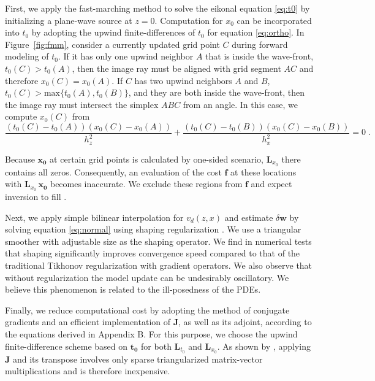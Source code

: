 First, we apply the fast-marching method \cite[]{sethian,sethian2} to solve the eikonal equation 
\ref{eq:t0} by initializing a plane-wave source at $z = 0$. Computation for $x_0$ can be incorporated into $t_0$ 
by adopting the upwind finite-differences of $t_0$ for equation \ref{eq:ortho}. In Figure~\ref{fig:fmm}, consider 
a currently updated grid point $C$ during forward modeling of $t_0$. If it has only one upwind neighbor $A$ that 
is inside the wave-front, $t_0 (C) > t_0 (A)$, then the image ray must be aligned with grid segment $AC$ and
therefore $x_0 (C) = x_0 (A)$.  If $C$ has two upwind neighbors $A$ 
and $B$, $t_0 (C) > \mbox{max}\{t_0 (A), t_0 (B)\}$, and they are both inside the wave-front, then the image 
ray must intersect the simplex $ABC$ from an angle. In this case, we compute $x_0 (C)$ from
\begin{equation}
\label{eq:two}
\frac{(t_0 (C) - t_0 (A))(x_0 (C) - x_0 (A))}{h_z^2} + 
\frac{(t_0 (C) - t_0 (B))(x_0 (C) - x_0 (B))}{h_x^2} = 0\;.
\end{equation}

Because $\mathbf{x_0}$ at certain grid points is calculated by one-sided scenario, $\mathbf{L}_{x_0}$ there 
contains all zeros. Consequently, an evaluation of the cost $\mathbf{f}$ at these locations with 
$\mathbf{L}_{x_0}\,\mathbf{x_0}$ becomes inaccurate. We exclude these regions from $\mathbf{f}$ and expect 
inversion to fill .

Next, we apply simple bilinear interpolation for $v_d (z,x)$ and estimate $\delta \mathbf{w}$ by 
solving equation \ref{eq:normal} using shaping regularization \cite[]{fomel2}. We use a 
triangular smoother with adjustable size as the shaping operator. We find in numerical tests that shaping 
significantly improves convergence speed compared to that of the traditional Tikhonov 
regularization \cite[]{tikhonov} with gradient operators. We also observe that without regularization the 
model update can be undesirably oscillatory. We believe this phenomenon is related to the ill-posedness of 
the PDEs.

Finally, we reduce computational cost by adopting the method of 
conjugate gradients \cite[]{hestenes} and an efficient implementation of $\mathbf{J}$, as well as its 
adjoint, according to the equations derived in Appendix B. For this purpose, we choose the upwind 
finite-difference scheme \cite[]{franklin,li1} based on 
$\mathbf{t_0}$ for both $\mathbf{L}_{t_0}$ and $\mathbf{L}_{x_0}$. As shown by \cite{li3}, applying 
$\mathbf{J}$ and its transpose involves only sparse triangularized matrix-vector multiplications and 
is therefore inexpensive. 

